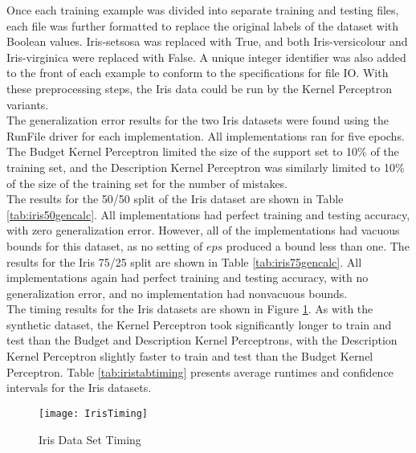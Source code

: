Once each training example was divided into separate training and testing files, each file was further formatted to replace the original labels of the dataset with Boolean values. Iris-setsosa was replaced with True, and both Iris-versicolour and Iris-virginica were replaced with False. A unique integer identifier was also added to the front of each example to conform to the specifications for file IO. With these preprocessing steps, the Iris data could be run by the Kernel Perceptron variants.
\\The generalization error results for the two Iris datasets were found using the RunFile driver for each implementation. All implementations ran for five epochs. The Budget Kernel Perceptron limited the size of the support set to 10\% of the training set, and the Description Kernel Perceptron was similarly limited to 10\% of the size of the training set for the number of mistakes. 
\\The results for the 50/50 split of the Iris dataset are shown in Table \ref{tab:iris50gencalc}. All implementations had perfect training and testing accuracy, with zero generalization error. However, all of the implementations had vacuous bounds for this dataset, as no setting of $\mathit{eps}$ produced a bound less than one. The results for the Iris 75/25 split are shown in Table \ref{tab:iris75gencalc}. All implementations again had perfect training and testing accuracy, with no generalization error, and no implementation had nonvacuous bounds.
\\The timing results for the Iris datasets are shown in Figure \ref{IrisTiming}. As with the synthetic dataset, the Kernel Perceptron took significantly longer to train and test than the Budget and Description Kernel Perceptrons, with the Description Kernel Perceptron slightly faster to train and test than the Budget Kernel Perceptron. Table \ref{tab:iristabtiming} presents average runtimes and confidence intervals for the Iris datasets.

\begin{figure}[h]
 \caption{Iris Data Set Timing}
 \label{IrisTiming}
 \begin{center}
  \texttt{[image: IrisTiming]}
 \end{center}
\end{figure}

